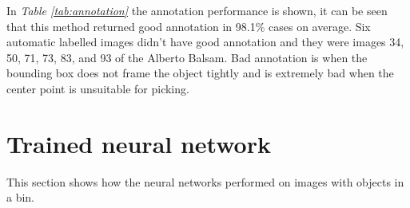 \begin{table}[h]
\caption{Annotation on the automatically generated dataset with one object in the bin }
\label{tab:annotation}
\end{table}

In \textit{Table \ref{tab:annotation}} the annotation performance is shown, it can be seen that this method returned good annotation in 98.1\% cases on average. Six automatic labelled images didn’t have good annotation and they were images 34, 50, 71, 73, 83, and 93 of the Alberto Balsam. Bad annotation is when the bounding box does not frame the object tightly and is extremely bad when the center point is unsuitable for picking.



\clearpage
\section{Trained neural network}\label{sec:resneural}
This section shows how the neural networks performed on images with objects in a bin.

